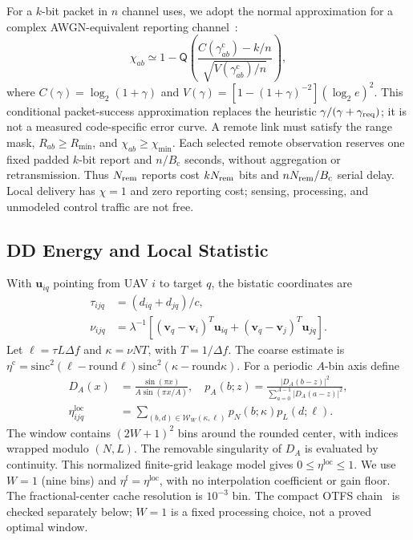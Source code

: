 For a $k$-bit packet in $n$ channel uses, we adopt the normal approximation
for a complex AWGN-equivalent reporting channel~\cite{polyanskiy_fbl}:
\begin{equation}
 \chi_{ab}\simeq1-\mathsf Q\!\left(
 \frac{C(\gamma_{ab}^{\mathrm c})-k/n}
 {\sqrt{V(\gamma_{ab}^{\mathrm c})/n}}\right),
 \label{eq:fbl_reliability}
\end{equation}
where $C(\gamma)=\log_2(1+\gamma)$ and
$V(\gamma)=[1-(1+\gamma)^{-2}](\log_2 e)^2$.
This conditional packet-success approximation replaces the heuristic
$\gamma/(\gamma+\gamma_{\rm req})$; it is not a measured code-specific error curve.
A remote link must satisfy the range mask, $R_{ab}\ge R_{\min}$, and
$\chi_{ab}\ge\chi_{\min}$. Each selected remote observation reserves one
fixed padded $k$-bit report and $n/B_{\mathrm c}$ seconds, without aggregation
or retransmission. Thus $N_{\rm rem}$ reports cost $kN_{\rm rem}$ bits and
$nN_{\rm rem}/B_{\mathrm c}$ serial delay. Local delivery has $\chi=1$ and zero
reporting cost; sensing, processing, and unmodeled control traffic are not free.

\subsection{DD Energy and Local Statistic}

With $\mathbf u_{iq}$ pointing from UAV $i$ to target $q$, the bistatic
coordinates are
\begin{equation}
\begin{aligned}
 \tau_{ijq}&=(d_{iq}+d_{jq})/c,\\
 \nu_{ijq}&=\lambda^{-1}\!\left[(\mathbf v_q-\mathbf v_i)^T\mathbf u_{iq}
 +(\mathbf v_q-\mathbf v_j)^T\mathbf u_{jq}\right].
\end{aligned}
 \label{eq:bistatic_delay_doppler}
\end{equation}
Let $\ell=\tau L\Delta f$ and $\kappa=\nu NT$, with $T=1/\Delta f$.
The coarse estimate is $\eta^{\mathrm c}=\mathrm{sinc}^2(\ell-\mathrm{round}\ell)
\mathrm{sinc}^2(\kappa-\mathrm{round}\kappa)$.
For a periodic $A$-bin axis define
\begin{equation}
\begin{aligned}
 D_A(x)&=\frac{\sin(\pi x)}{A\sin(\pi x/A)},\quad
 p_A(b;z)=\frac{|D_A(b-z)|^2}{\sum_{a=0}^{A-1}|D_A(a-z)|^2},\\
 \eta^{\mathrm{loc}}_{ijq}
 &=\sum_{(b,d)\in\mathcal W_W(\kappa,\ell)}p_N(b;\kappa)p_L(d;\ell).
\end{aligned}
 \label{eq:local_dd_energy}
\end{equation}
The window contains $(2W+1)^2$ bins around the rounded center, with indices
wrapped modulo $(N,L)$. The removable singularity of $D_A$ is evaluated by
continuity. This normalized finite-grid leakage model gives
$0\le\eta^{\mathrm{loc}}\le1$. We use $W=1$ (nine bins) and
$\eta^{\mathrm f}=\eta^{\mathrm{loc}}$, with no interpolation coefficient or gain
floor. The fractional-center cache resolution is $10^{-3}$ bin.
The compact OTFS chain~\cite{hadani_otfs} is checked separately below;
$W=1$ is a fixed processing choice, not a proved optimal window.

